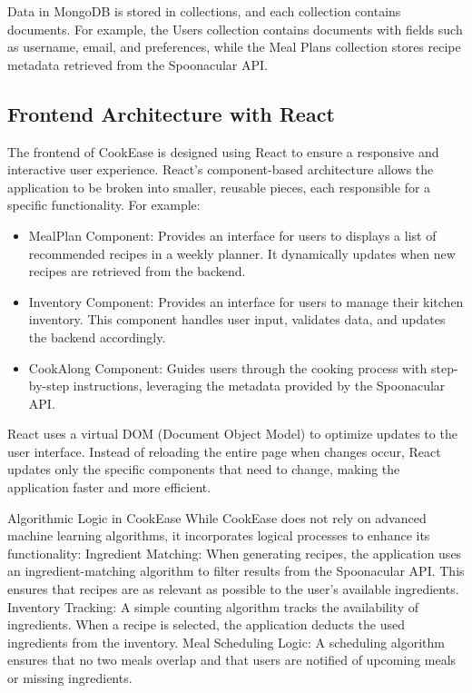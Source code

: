 \documentclass[10pt,twocolumn]{article}
\begin{document}
Data in MongoDB is stored in collections, and each collection contains documents. For example, the Users collection contains documents with fields such as username, email, and preferences, while the Meal Plans collection stores recipe metadata retrieved from the Spoonacular API.

\subsection{Frontend Architecture with React}
The frontend of CookEase is designed using React to ensure a responsive and interactive user experience. React’s component-based architecture allows the application to be broken into smaller, reusable pieces, each responsible for a specific functionality. For example:
\begin{itemize}
    \item MealPlan Component: Provides an interface for users to displays a list of recommended recipes in a weekly planner. It dynamically updates when new recipes are retrieved from the backend.
    \item Inventory Component: Provides an interface for users to manage their kitchen inventory. This component handles user input, validates data, and updates the backend accordingly.
    \item CookAlong Component: Guides users through the cooking process with step-by-step instructions, leveraging the metadata provided by the Spoonacular API.
\end{itemize}
React uses a virtual DOM (Document Object Model) to optimize updates to the user interface. Instead of reloading the entire page when changes occur, React updates only the specific components that need to change, making the application faster and more efficient.

Algorithmic Logic in CookEase
While CookEase does not rely on advanced machine learning algorithms, it incorporates logical processes to enhance its functionality:
Ingredient Matching: When generating recipes, the application uses an ingredient-matching algorithm to filter results from the Spoonacular API. This ensures that recipes are as relevant as possible to the user’s available ingredients.
Inventory Tracking: A simple counting algorithm tracks the availability of ingredients. When a recipe is selected, the application deducts the used ingredients from the inventory.
Meal Scheduling Logic: A scheduling algorithm ensures that no two meals overlap and that users are notified of upcoming meals or missing ingredients.
\end{document}
